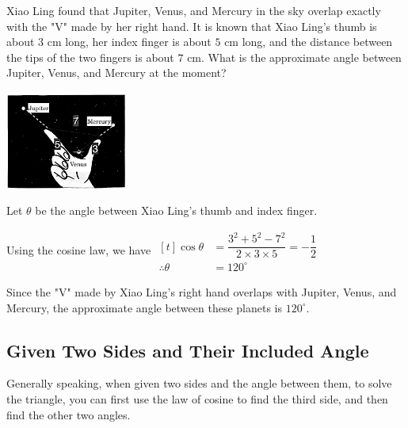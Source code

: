 \documentclass{report}
\begin{document}
    \begin{question}
        \begin{vwcol}[widths={0.6,0.4}, sep=8mm, rule=0pt]
            Xiao Ling found that Jupiter, Venus, and Mercury in the sky overlap exactly with the "V" made by her right hand. It is known that Xiao Ling's thumb is about $3$ cm long, her index finger is about $5$ cm long, and the distance between the tips of the two fingers is about $7$ cm. What is the approximate angle between Jupiter, Venus, and Mercury at the moment?

            \includegraphics[width=0.3\textwidth]{assets/10-23.jpg}
        \end{vwcol}

        \sol{}

        \noindent Let $\theta$ be the angle between Xiao Ling's thumb and index finger.

        \noindent Using the cosine law, we have $\begin{aligned}[t] \cos \theta&=\dfrac{3^2+5^2-7^2}{2 \times 3 \times 5}=-\dfrac{1}{2} \\ \therefore \theta&=120^{\circ}\end{aligned}$

        \noindent Since the "V" made by Xiao Ling's right hand overlaps with Jupiter, Venus, and Mercury, the approximate angle between these planets is $120^\circ$.
    \end{question}

    \vspace{-2em}   
    \subsection*{Given Two Sides and Their Included Angle}
    
    Generally speaking, when given two sides and the angle between them, to solve the triangle, you can first use the law of cosine to find the third side, and then find the other two angles.
\end{document}
